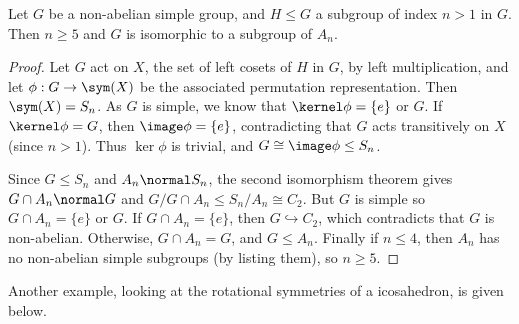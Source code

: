 \documentclass[a4paper]{scrartcl}
\begin{document}
\begin{theorem}
	Let $G$ be a non-abelian simple group, and $H\leq G$ a subgroup of index $n > 1$ in $G$. Then $n \geq 5$ and $G$ is isomorphic to a subgroup of $A_n$.
\end{theorem}
\begin{proof}
	Let $G$ act on $X$, the set of left cosets of $H$ in $G$, by left multiplication, and let $\phi: G \rightarrow \sym(X)$ be the associated permutation representation. Then $\sym(X) = S_n$. As $G$ is simple, we know that $\kernel \phi = \{e\}$ or $G$. If $\kernel \phi = G$, then $\image \phi = \{e\}$, contradicting that $G$ acts transitively on $X$ (since $n > 1$). Thus $\ker \phi$ is trivial, and $G \cong \image \phi \leq S_n$.

	Since $G \leq S_n$ and $A_n \normal S_n$, the second isomorphism theorem gives $G \cap A_n \normal G$ and $G / G \cap A_n \leq S_n / A_n \cong C_2$. But $G$ is simple so $G \cap A_n = \{e\}$ or $G$. If $G \cap A_n = \{e\}$, then $G \hookrightarrow C_2$, which contradicts that $G$ is non-abelian. Otherwise, $G \cap A_n = G$, and $G \leq A_n$. Finally if $n \leq 4$, then $A_n$ has no non-abelian simple subgroups (by listing them), so $n \geq 5$.
\end{proof}

Another example, looking at the rotational symmetries of a icosahedron, is given below.
\end{document}
